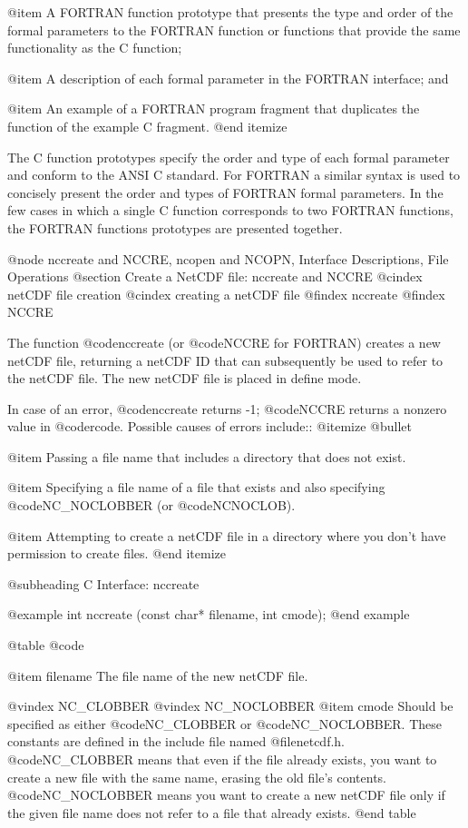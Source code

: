 @item
A FORTRAN function prototype that presents the type and order of the
formal parameters to the FORTRAN function or functions that provide the
same functionality as the C function;

@item
A description of each formal parameter in the FORTRAN interface; and

@item
An example of a FORTRAN program fragment that duplicates the function of
the example C fragment.
@end itemize

The C function prototypes specify the order and type of each formal
parameter and conform to the ANSI C standard.  For FORTRAN a similar
syntax is used to concisely present the order and types of FORTRAN
formal parameters.  In the few cases in which a single C function
corresponds to two FORTRAN functions, the FORTRAN functions prototypes
are presented together.

@node nccreate and NCCRE, ncopen and NCOPN, Interface Descriptions, File Operations
@section  Create a NetCDF file:  nccreate and NCCRE
@cindex netCDF file creation
@cindex creating a netCDF file
@findex nccreate
@findex NCCRE

The function @code{nccreate} (or @code{NCCRE} for FORTRAN) creates a
new netCDF file, returning a netCDF ID that can subsequently be used to
refer to the netCDF file.  The new netCDF file is placed in define mode.

In case of an error, @code{nccreate} returns -1; @code{NCCRE} returns a
nonzero value in @code{rcode}.  Possible causes of errors include::
@itemize @bullet

@item
Passing a file name that includes a directory that does not exist.

@item
Specifying a file name of a file that exists and also specifying
@code{NC_NOCLOBBER} (or @code{NCNOCLOB}).

@item
Attempting to create a netCDF file in a directory where you don't have
permission to create files.
@end itemize

@subheading C Interface:  nccreate

@example
int nccreate (const char* filename, int cmode);
@end example

@table @code

@item filename
The file name of the new netCDF file.

@vindex NC_CLOBBER
@vindex NC_NOCLOBBER
@item cmode
Should be specified as either @code{NC_CLOBBER} or @code{NC_NOCLOBBER}.  These
constants are defined in the include file named @file{netcdf.h}.
@code{NC_CLOBBER} means that even if the file already exists, you want to
create a new file with the same name, erasing the old file's contents.
@code{NC_NOCLOBBER} means you want to create a new netCDF file only if the
given file name does not refer to a file that already exists.
@end table

